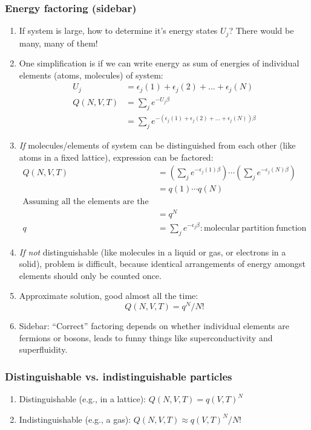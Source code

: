 \documentclass[11pt]{article}
\begin{document}
\subsubsection{Energy factoring (sidebar)}
\label{sec:org733799d}
\begin{enumerate}
\item If system is large, how to determine it's energy states \(U_j\)?  There would be many, many of them!
\item One simplification is if we can write energy as sum of energies of individual elements (atoms, molecules) of system:
\begin{align}
  U_j&=\epsilon_j(1)+\epsilon_j(2) + ... + \epsilon_j(N) \\
  Q(N,V,T) &= \sum_j e^{-U_j\beta} \\
  &=\sum_je^{-(\epsilon_j(1)+\epsilon_j(2) + ... + \epsilon_j(N))\beta}
\end{align}
\item \emph{If} molecules/elements of system can be distinguished from each
other (like atoms in a fixed lattice), expression can be factored:
   \begin{align}
     Q(N,V,T)&=\left ( \sum_j e^{-\epsilon_j(1)\beta}\right )\cdots \left ( \sum_j
       e^{-\epsilon_j(N)\beta}\right ) \\
   &= q(1)\cdots q(N) \\
   \text{Assuming all the elements are the same:}\\
   &= q^N \\
  q&=\sum_j e^{-\epsilon_j \beta}: \mathrm{molecular\ partition\ function}
\end{align}
\item \emph{If not} distinguishable (like molecules in a liquid or gas, or electrons in a solid), problem is difficult, because identical
arrangements of energy amongst elements should only be counted once.
\item Approximate solution, good almost all the time:
\begin{equation}
  Q(N,V,T)=q^N/N!
\end{equation}
\item Sidebar: ``Correct'' factoring depends on whether individual elements are fermions or bosons, leads to funny things like superconductivity and superfluidity.
\end{enumerate}

\subsubsection{Distinguishable vs. indistinguishable particles}
\label{sec:org68ba5b0}
\begin{enumerate}
\item Distinguishable (e.g., in a lattice): \(Q(N,V,T) = q(V,T)^N\)
\item Indistinguishable (e.g., a gas): \(Q(N,V,T)\approx q(V,T)^N/N!\)
\end{enumerate}
\end{document}
